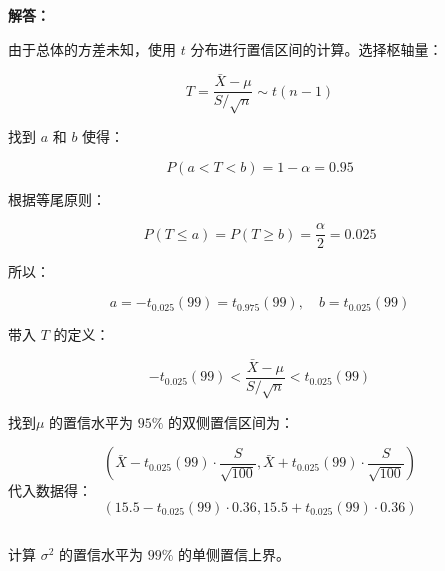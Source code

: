 \documentclass[12pt,a4paper]{article}
\begin{document}
\begin{answerbox}
\textbf{解答：}

由于总体的方差未知，使用 $t$ 分布进行置信区间的计算。选择枢轴量：

$$
T = \frac{\bar{X}-\mu}{S/\sqrt{n}} \sim t(n-1)
$$

找到 $a$ 和 $b$ 使得：

$$
P\left(a<T<b\right) = 1 - \alpha = 0.95
$$

根据等尾原则：

$$
P\left(T \leq a\right) = P\left(T \geq b\right) = \frac{\alpha}{2} = 0.025
$$

所以：

$$
a = -t_{0.025}(99) = t_{0.975}(99), \quad b = t_{0.025}(99)
$$

带入 $T$ 的定义：

$$
-t_{0.025}(99) < \frac{\bar{X}-\mu}{S/\sqrt{n}} < t_{0.025}(99)
$$

找到$\mu$ 的置信水平为 $95\%$ 的双侧置信区间为：

$$
\left(\bar{X} - t_{0.025}(99) \cdot \frac{S}{\sqrt{100}}, \bar{X} + t_{0.025}(99) \cdot \frac{S}{\sqrt{100}}\right)
$$
代入数据得：
$$
\left(15.5 - t_{0.025}(99) \cdot 0.36, 15.5 + t_{0.025}(99) \cdot 0.36\right)
$$
\end{answerbox}

\subsection{}

计算 $\sigma^2$ 的置信水平为 $99\%$ 的单侧置信上界。
\end{document}
